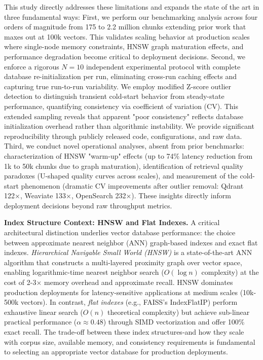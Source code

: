 \documentclass{article}
\begin{document}
This study directly addresses these limitations and expands the state of the art in three fundamental ways:
First, we perform our benchmarking analysis across four orders of magnitude from 175 to 2.2 million chunks extending prior work that maxes out at 100k vectors. This validates scaling behavior at production scales where single-node memory constraints, HNSW graph maturation effects, and performance degradation become critical to deployment decisions.
Second, we enforce a rigorous $N=10$ independent experimental protocol with complete database re-initialization per run, eliminating cross-run caching effects and capturing true run-to-run variability. We employ modified Z-score outlier detection to distinguish transient cold-start behavior from steady-state performance, quantifying consistency via coefficient of variation (CV). This extended sampling reveals that apparent "poor consistency" reflects database initialization overhead rather than algorithmic instability.
We provide significant reproducibility through publicly released code, configurations, and raw data.
Third, we conduct novel operational analyses, absent from prior benchmarks: characterization of HNSW "warm-up" effects (up to 74\% latency reduction from 1k to 50k chunks due to graph maturation), identification of retrieval quality paradoxes (U-shaped quality curves across scales), and measurement of the cold-start phenomenon (dramatic CV improvements after outlier removal: Qdrant 122×, Weaviate 133×, OpenSearch 232×). These insights directly inform deployment decisions beyond raw throughput metrics.

\textbf{Index Structure Context: HNSW and Flat Indexes.} A critical architectural distinction underlies vector database performance: 
the choice between approximate nearest neighbor (ANN) graph-based indexes and exact flat indexes. \textit{Hierarchical Navigable Small World 
(HNSW)} is a state-of-the-art ANN algorithm that constructs a multi-layered proximity graph over vector space, enabling logarithmic-time 
nearest neighbor search ($O(\log n)$ complexity) at the cost of 2-3× memory overhead and approximate recall. HNSW dominates production 
deployments for latency-sensitive applications at medium scales (10k-500k vectors). In contrast, \textit{flat indexes} (e.g., FAISS's 
IndexFlatIP) perform exhaustive linear search ($O(n)$ theoretical complexity) but achieve sub-linear practical performance ($\alpha \approx 0.48$) 
through SIMD vectorization and offer 100\% exact recall. The trade-off between these index structures-and how they scale with corpus 
size, available memory, and consistency requirements is fundamental to selecting an appropriate vector database for production deployments.
\end{document}
